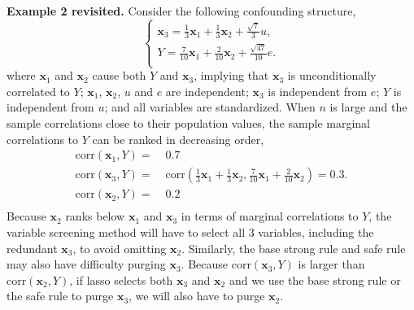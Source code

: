 \documentclass[12pt]{article}
\begin{document}
\bigskip
\noindent
\textbf{Example 2 revisited.} Consider the following confounding structure,
%
\begin{equation}
	\begin{cases}
    \mathbf{x}_3 = \frac{1}{3} \mathbf{x}_1 + \frac{1}{3} \mathbf{x}_2 + \frac{\sqrt{7}}{3} u, \\
    Y = \frac{7}{10} \mathbf{x}_1 +  \frac{2}{10} \mathbf{x}_2 +  \frac{\sqrt{47}}{10} e. \\
	\end{cases}
	\label{eqn:example_4}
\end{equation}
%
where $\mathbf{x}_1$ and $\mathbf{x}_2$ cause both $Y$ and $\mathbf{x}_3$, implying that $\mathbf{x}_3$ is unconditionally correlated to $Y$; $\mathbf{x}_1$, $\mathbf{x}_2$, $u$ and $e$ are independent; $\mathbf{x}_3$ is independent from $e$; $Y$ is independent from $u$; and all variables are standardized. When $n$ is large and the sample correlations close to their population values, the sample marginal correlations to $Y$ can be ranked in decreasing order,
%
\begin{equation}
  \begin{aligned}
    \mathrm{corr} \left( \mathbf{x}_1, Y \right)  = & \;0.7 \\
    \mathrm{corr} \left( \mathbf{x}_3, Y \right)  = & \;\mathrm{corr} \left( \frac{1}{3} \mathbf{x}_1 + \frac{1}{3} \mathbf{x}_2, \frac{7}{10} \mathbf{x}_1 +  \frac{2}{10} \mathbf{x}_2 \right)
    = 0.3. \\
    \mathrm{corr} \left( \mathbf{x}_2, Y \right)  = & \;0.2 \\
  \end{aligned}
\end{equation}
%
Because $\mathbf{x}_2$ ranks below $\mathbf{x}_1$ and $\mathbf{x}_3$ in terms of marginal correlations to $Y$, the variable screening method will have to select all $3$ variables, including the redundant $\mathbf{x}_3$, to avoid omitting $\mathbf{x}_2$. Similarly, the base strong rule and safe rule may also have difficulty purging $\mathbf{x}_3$. Because $\mathrm{corr} \left( \mathbf{x}_3, Y \right)$ is larger than $\mathrm{corr} \left( \mathbf{x}_2, Y \right)$, if lasso selects both $\mathbf{x}_3$ and $\mathbf{x}_2$ and we use the base strong rule or the safe rule to purge $\mathbf{x}_3$, we will also have to purge $\mathbf{x}_2$.
\end{document}
